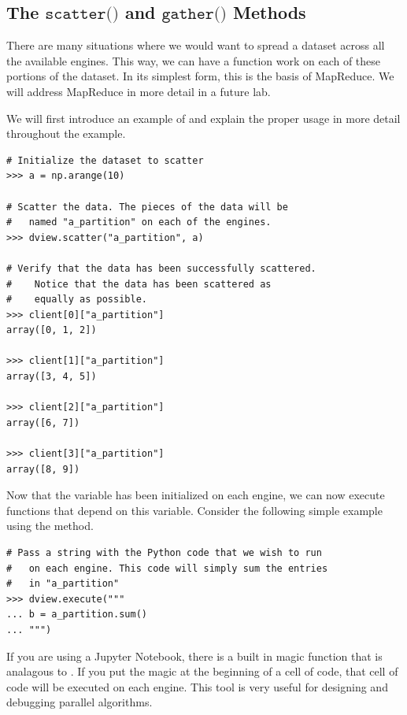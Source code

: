 \subsection*{The $\texttt{scatter()}$ and $\texttt{gather()}$ Methods}
There are many situations where we would want to spread a dataset across all the available engines. This way, we can have a function work on each of these portions of the dataset. In its simplest form, this is the basis of MapReduce. We will address MapReduce in more detail in a future lab.

We will first introduce an example of  and explain the proper usage in more detail throughout the example.

\begin{lstlisting}
# Initialize the dataset to scatter
>>> a = np.arange(10)

# Scatter the data. The pieces of the data will be
#   named "a_partition" on each of the engines.
>>> dview.scatter("a_partition", a)

# Verify that the data has been successfully scattered.
#    Notice that the data has been scattered as
#    equally as possible.
>>> client[0]["a_partition"]
array([0, 1, 2])

>>> client[1]["a_partition"]
array([3, 4, 5])

>>> client[2]["a_partition"]
array([6, 7])

>>> client[3]["a_partition"]
array([8, 9])
\end{lstlisting}

Now that the  variable has been initialized on each engine, we can now execute functions that depend on this variable. Consider the following simple example using the  method.

\begin{lstlisting}
# Pass a string with the Python code that we wish to run
#   on each engine. This code will simply sum the entries
#   in "a_partition"
>>> dview.execute("""
... b = a_partition.sum()
... """)
\end{lstlisting}

\begin{info}
If you are using a Jupyter Notebook, there is a built in magic function that is analagous to . If you put the  magic at the beginning of a cell of code, that cell of code will be executed on each engine. This tool is very useful for designing and debugging parallel algorithms.
\end{info}


